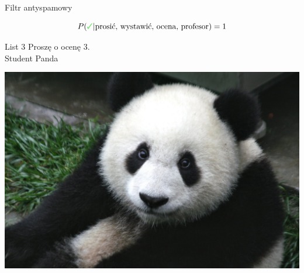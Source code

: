 \documentclass{mp}
\begin{document}
\begin{frame}{Filtr antyspamowy}
{\begin{minipage}{.45\textwidth}
\end{minipage}
\[ P(\cmark | \text{prosić, wystawić, ocena, profesor})=1 \]
}
{
	\begin{minipage}{.50\textwidth}
\begin{block}{List 3}
Proszę o ocenę 3.\\
Student Panda
\end{block}
\end{minipage}
\hfill
\begin{minipage}{.45\textwidth}
\includegraphics[width=\textwidth]{Panda_Cub_from_Wolong,_Sichuan,_China.JPG}\\
\end{minipage}

}
\end{frame}
\end{document}
